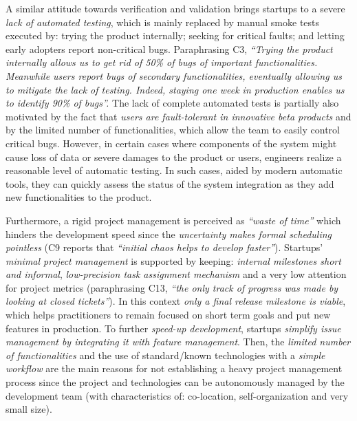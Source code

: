 \documentclass[10pt,journal,letterpaper,compsoc]{IEEEtran}
\begin{document}
A similar attitude towards verification and validation brings startups to a severe \textit{lack of automated testing}, which is mainly replaced by manual smoke tests executed by: trying the product internally; seeking for critical faults; and letting early adopters report non-critical bugs.  Paraphrasing C3, \textit{``Trying the product internally allows us to get rid of 50\% of bugs of important functionalities. Meanwhile users report bugs of secondary functionalities, eventually allowing us to mitigate the lack of testing. Indeed, staying one week in production enables us to identify 90\% of bugs''.} The lack of complete automated tests is partially also motivated by the fact that \textit{users are fault-tolerant in innovative beta products} and  by the limited number of functionalities, which allow the team to easily control critical bugs. However, in certain cases where components of the system might cause loss of data or severe damages to the product or users, engineers realize a reasonable level of 
automatic testing. In such cases, aided by modern automatic tools, they can quickly assess the status of the system integration as they add new functionalities to the product.

Furthermore, a rigid project management is perceived as \textit{``waste of time''} which hinders the development speed since the \textit{uncertainty makes formal scheduling pointless} (C9  reports that \textit{``initial chaos helps to develop faster''}). Startups' \textit{minimal project management}  is supported by keeping: \textit{internal milestones short and informal}, \textit{low-precision task assignment mechanism}  and a very low attention for project metrics (paraphrasing C13, \textit{``the only track of progress was made by looking at closed tickets''}). In this context \textit{only a final release milestone is viable}, which helps practitioners to remain focused on short term goals and put new features in production. To further \textit{speed-up development}, startups \textit{simplify issue management by integrating it with feature management}. Then, the \textit{limited number of functionalities} and the {use of standard/known technologies} with a \textit{simple workflow} are the main reasons for 
not establishing a heavy project management process since the project and technologies can be autonomously managed by the development team (with characteristics of: co-location, self-organization and very small size). %
\end{document}
